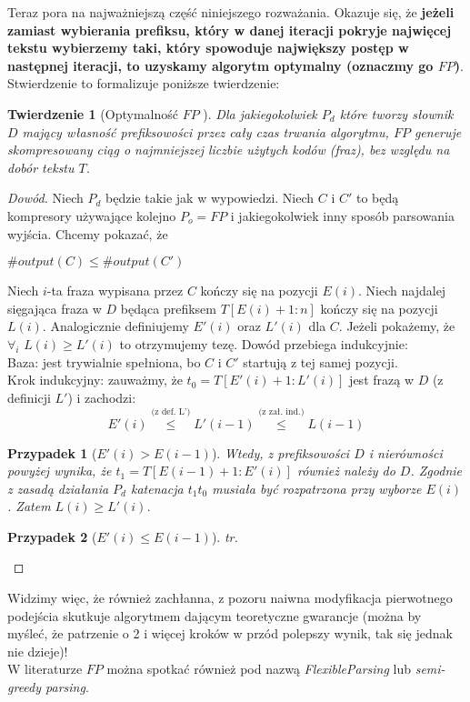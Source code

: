 \documentclass[12pt]{article}
\theoremstyle{plain}
\newtheorem{theorem}{Twierdzenie}[]
\newtheorem{case}{Przypadek}
\begin{document}
Teraz pora na najważniejszą część niniejszego rozważania. Okazuje się, że \textbf{jeżeli zamiast wybierania prefiksu, który w danej iteracji pokryje najwięcej tekstu wybierzemy taki, który spowoduje największy postęp w następnej iteracji, to uzyskamy algorytm optymalny (oznaczmy go $FP$)}. Stwierdzenie to formalizuje poniższe twierdzenie:

\begin{theorem}[Optymalność $FP$ \cite{DBLP:conf/soda/MatiasS99}]
Dla jakiegokolwiek $P_{d}$ które tworzy słownik $D$ mający własność prefiksowości przez cały czas trwania algorytmu, $FP$ generuje skompresowany ciąg o najmniejszej liczbie użytych kodów (fraz), bez względu na dobór tekstu $T$.
\end{theorem}
\begin{proof}[Dowód]
Niech $P_{d}$ będzie takie jak w wypowiedzi. Niech $C$ i $C'$ to będą kompresory używające kolejno $P_{o} = FP$ i jakiegokolwiek inny sposób parsowania wyjścia. Chcemy pokazać, że \begin{center}
$\#output(C) \leq \#output(C')$
\end{center}

Niech $i$-ta fraza wypisana przez $C$ kończy się na pozycji $E(i)$. 
Niech najdalej sięgająca fraza w $D$ będąca prefiksem $T[E(i)+1:n]$ kończy się na pozycji $L(i)$.
Analogicznie definiujemy $E'(i)$ oraz $L'(i)$ dla $C$.
Jeżeli pokażemy, że $\forall_{i}$ $L(i) \geq L'(i)$ to otrzymujemy tezę. Dowód przebiega indukcyjnie:\\
Baza: jest trywialnie spełniona, bo $C$ i $C'$ startują z tej samej pozycji.\\
Krok indukcyjny: zauważmy, że $t_{0} = T[E'(i)+1:L'(i)]$ jest frazą w $D$ (z definicji $L'$) i zachodzi: 
\[E'(i) \overset{\text{(z def. L')}}{\leq} L'(i-1) \overset{\text{(z zał. ind.)}}{\leq} L(i-1) \]
\begin{case}[$E'(i) > E(i-1)$]
Wtedy, z prefiksowości $D$ i nierówności powyżej wynika, że $t_{1} = T[E(i-1)+1:E'(i)]$ również należy do $D$. Zgodnie z zasadą działania $P_{d}$ katenacja $t_{1}t_{0}$ musiała być rozpatrzona przy wyborze $E(i)$. Zatem $L(i) \geq L'(i)$.
\end{case}
\begin{case}[$E'(i) \leq E(i-1)$]
tr.
\end{case}
\end{proof}
Widzimy więc, że również zachłanna, z pozoru naiwna modyfikacja pierwotnego podejścia skutkuje algorytmem dającym teoretyczne gwarancje (można by myśleć, że patrzenie o 2 i więcej kroków w przód polepszy wynik, tak się jednak nie dzieje)! \\ W literaturze $FP$ można spotkać również pod nazwą \textit{FlexibleParsing} lub \textit{semi-greedy parsing}.
\end{document}
